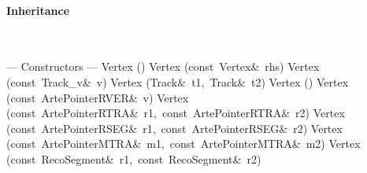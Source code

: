 \documentclass{article}
\begin{document}
\begin{cxxentry}
\begin{cxxclass}
\begin{cxxInheritance}
\paragraph{Inheritance}\strut\smallskip\strut\\
\end{cxxInheritance}
\begin{cxxpublic}
\cxxitem{}
        {--- Constructors --- }
        {}
        {}
        {}
\label{cxx.1.2.1}
\cxxitem{}
        {Vertex}
        {()}
        {}
        {}
\label{cxx.1.2.2}
\cxxitem{}
        {Vertex}
        {(const\ Vertex\&\ rhs)}
        {}
        {}
\label{cxx.1.2.3}
\cxxitem{}
        {Vertex}
        {(const\ Track\_v\&\ v)}
        {}
        {}
\label{cxx.1.2.4}
\cxxitem{}
        {Vertex}
        {(Track\&\ t1,\ Track\&\ t2)}
        {}
        {}
\label{cxx.1.2.5}
\cxxitem{}
        {\cxxtilde Vertex}
        {()}
        {}
        {}
\label{cxx.1.2.6}
\cxxitem{}
        {Vertex}
        {(const\ ArtePointer\<RVER\>\&\ v)}
        {}
        {}
\label{cxx.1.2.7}
\cxxitem{}
        {Vertex}
        {(const\ ArtePointer\<RTRA\>\&\ r1,\ const\ ArtePointer\<RTRA\>\&\ r2)}
        {}
        {}
\label{cxx.1.2.8}
\cxxitem{}
        {Vertex}
        {(const\ ArtePointer\<RSEG\>\&\ r1,\ const\ ArtePointer\<RSEG\>\&\ r2)}
        {}
        {}
\label{cxx.1.2.9}
\cxxitem{}
        {Vertex}
        {(const\ ArtePointer\<MTRA\>\&\ m1,\ const\ ArtePointer\<MTRA\>\&\ m2)}
        {}
        {}
\label{cxx.1.2.10}
\cxxitem{}
        {Vertex}
        {(const\ RecoSegment\&\ r1,\ const\ RecoSegment\&\ r2)}

\end{cxxpublic}
\end{cxxclass}
\end{cxxentry}
\end{document}
